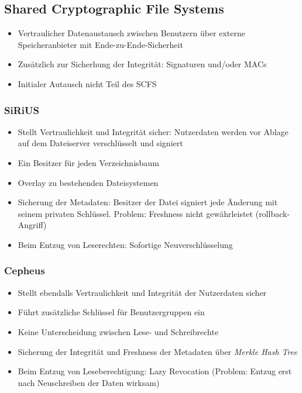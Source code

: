 \subsection{Shared Cryptographic File Systems}
\begin{itemize}
	\item Vertraulicher Datenaustausch zwischen Benutzern über externe Speicheranbieter mit Ende-zu-Ende-Sicherheit
	\item Zusätzlich zur Sicherhung der Integrität: Signaturen und/oder MACs
	\item Initialer Autausch nicht Teil des SCFS
\end{itemize}

\subsubsection{SiRiUS}
\begin{itemize}
	\item Stellt Vertraulichkeit und Integrität sicher: Nutzerdaten werden vor Ablage auf dem Dateiserver verschlüsselt und signiert
	\item Ein Besitzer für jeden Verzeichnisbaum
	\item Overlay zu bestehenden Dateisystemen
	\item Sicherung der Metadaten: Besitzer der Datei signiert jede Änderung mit seinem privaten Schlüssel. Problem: Freshness nicht gewährleistet (rollback-Angriff)
	\item Beim Entzug von Leserechten: Sofortige Neuverschlüsselung
\end{itemize}

\subsubsection{Cepheus}
\begin{itemize}
	\item Stellt ebendalls Vertraulichkeit und Integrität der Nutzerdaten sicher
	\item Führt zusätzliche Schlüssel für Benutzergruppen ein
	\item Keine Unterscheidung zwischen Lese- und Schreibrechte
	\item Sicherung der Integrität und Freshness der Metadaten über \textit{Merkle Hash Tree}
	\item Beim Entzug von Leseberechtigung: Lazy Revocation (Problem: Entzug erst nach Neuschreiben der Daten wirksam)
\end{itemize}

